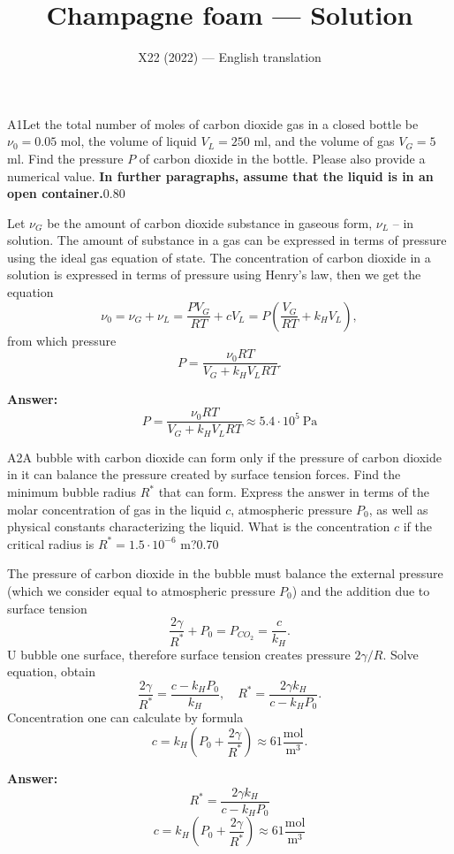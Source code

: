 \documentclass[11pt,a4paper]{article}
\title{\textbf{Champagne foam --- Solution}}
\author{\normalsize X22 (2022) — English translation}
\date{}
\begin{document}
\maketitle\vspace{-0.5em}
\begin{solcard}{A1}{Let the total number of moles of carbon dioxide gas in a closed bottle be $\nu_0 = 0.05$ mol, the volume of liquid $V_L =250$ ml, and the volume of gas $V_G = 5$ ml. Find the pressure $P$ of carbon dioxide in the bottle. Please also provide a numerical value. \textbf{In further paragraphs, assume that the liquid is in an open container.}}{0.80}

Let $\nu_G$ be the amount of carbon dioxide substance in gaseous form, $\nu_L$ – in solution. The amount of substance in a gas can be expressed in terms of pressure using the ideal gas equation of state. The concentration of carbon dioxide in a solution is expressed in terms of pressure using Henry's law, then we get the equation $$ \nu_0 = \nu _G + \nu _L = \frac{PV_G}{RT} + cV_L = P\left( \frac{V_G}{RT} + k_H V_L\right), $$ from which pressure $$ P = \frac{\nu_0 R T}{V_G + k_H V_L RT}. $$

\par\smallskip\noindent\textbf{Answer:} $$ P = \frac{\nu_0 R T}{V_G + k_H V_L RT} \approx 5.4 \cdot 10^5~\text{Pa} $$
\end{solcard}

\begin{solcard}{A2}{A bubble with carbon dioxide can form only if the pressure of carbon dioxide in it can balance the pressure created by surface tension forces. Find the minimum bubble radius $R^*$ that can form. Express the answer in terms of the molar concentration of gas in the liquid $c$, atmospheric pressure $P_0$, as well as physical constants characterizing the liquid. What is the concentration $c$ if the critical radius is $R^* = 1.5 \cdot 10^{-6}$ m?}{0.70}

The pressure of carbon dioxide in the bubble must balance the external pressure (which we consider equal to atmospheric pressure $P_0$) and the addition due to surface tension $$ \frac{2 \gamma}{R^*} + P_0 = P_{CO_2} = \frac{c}{k_H}. $$ U bubble one surface, therefore surface tension creates pressure $2 \gamma/R$. Solve equation, obtain $$ \frac{2 \gamma}{R^*} = \frac{c - k_H P_0}{k_H},\quad R^* = \frac{2 \gamma k_H}{c - k_H P_0}. $$ Concentration one can calculate by formula $$ c = k_H\left( P_0+\frac{2 \gamma}{R^*}\right) \approx  61 \frac{\text{mol}}{\text{m}^3}. $$

\par\smallskip\noindent\textbf{Answer:} $$ R^* = \frac{2 \gamma k_H}{c - k_H P_0} $$ $$ c = k_H\left( P_0+\frac{2 \gamma}{R^*}\right) \approx  61 \frac{\text{mol}}{\text{m}^3} $$
\end{solcard}
\end{document}

